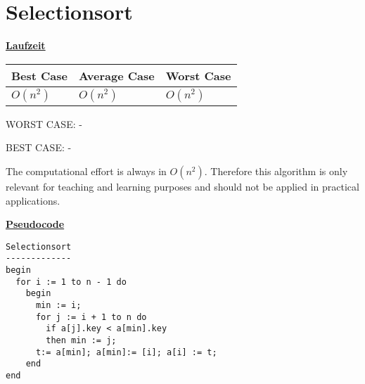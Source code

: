 \documentclass[a4paper]{report}
\begin{document}
\chapter*{Selectionsort}

\underline{\bf{Laufzeit}}

\begin{tabular}{|l|l|l|}
\hline
Best Case    & Average Case  &  Worst Case\\ \hline
$O(n^2)$ & $O(n^2)$  &  $O(n^2)$  \\ \hline
\end{tabular}

WORST CASE: - 


BEST CASE: -

The computational effort is always in $O(n^2)$. Therefore this algorithm is only relevant for teaching and learning purposes and should not be applied in practical applications.

\underline{\bf{Pseudocode}}



\begin{lstlisting}
Selectionsort
-------------
begin
  for i := 1 to n - 1 do
    begin
      min := i;
      for j := i + 1 to n do 
        if a[j].key < a[min].key
        then min := j;
      t:= a[min]; a[min]:= [i]; a[i] := t;
    end
end
\end{lstlisting}
\end{document}

